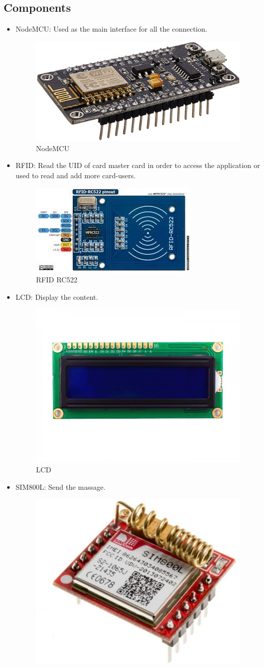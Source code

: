 \documentclass[12pt, a4paper, oneside]{article}
\begin{document}
\subsection{Components}
\begin{itemize}
	\item NodeMCU:\quad
	Used as the main interface for all the connection.
	\begin{figure}[H]
		\centering
		\includegraphics[width=0.4\linewidth]{nodeMCu}
		\caption{NodeMCU}
		\label{fig:ModelSim and De2i-150 board}
	\end{figure}
	\item RFID: \quad 
	Read the UID of card master card in order to access the application or used to read and add more card-users.
	\begin{figure}[H]
		\centering
		\includegraphics[width=0.4\linewidth]{RFID}
		\caption{RFID RC522}
		\label{fig:ModelSim and De2i-150 board}
	\end{figure}
	\item LCD:\quad 
	Display the content.
	\begin{figure}[H]
		\centering
		\includegraphics[width=0.4\linewidth]{LCD}
		\caption{LCD}
		\label{fig:ModelSim and De2i-150 board}
	\end{figure}
	\item SIM800L:\quad
	Send the massage.
	\begin{figure}[H]
		\centering
		\includegraphics[width=0.3\linewidth]{SIM}

\end{figure}
\end{itemize}
\end{document}
